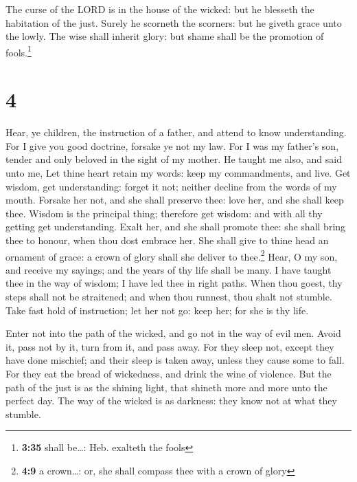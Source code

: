  The curse of the LORD is in the house of the wicked: but
he blesseth the habitation of the just.  Surely he
scorneth the scorners: but he giveth grace unto the lowly.
 The wise shall inherit glory: but shame shall be the
promotion of fools.\footnote{\textbf{3:35} shall be\ldots: Heb. exalteth
  the fools}

\hypertarget{section-3}{%
\section{4}\label{section-3}}

 Hear, ye children, the instruction of a father, and
attend to know understanding.  For I give you good
doctrine, forsake ye not my law.  For I was my father's
son, tender and only beloved in the sight of my mother. 
He taught me also, and said unto me, Let thine heart retain my words:
keep my commandments, and live.  Get wisdom, get
understanding: forget it not; neither decline from the words of my
mouth.  Forsake her not, and she shall preserve thee: love
her, and she shall keep thee.  Wisdom is the principal
thing; therefore get wisdom: and with all thy getting get understanding.
 Exalt her, and she shall promote thee: she shall bring
thee to honour, when thou dost embrace her.  She shall
give to thine head an ornament of grace: a crown of glory shall she
deliver to thee.\footnote{\textbf{4:9} a crown\ldots: or, she shall
  compass thee with a crown of glory}  Hear, O my son,
and receive my sayings; and the years of thy life shall be many.
 I have taught thee in the way of wisdom; I have led thee
in right paths.  When thou goest, thy steps shall not be
straitened; and when thou runnest, thou shalt not stumble.
 Take fast hold of instruction; let her not go: keep her;
for she is thy life.

 Enter not into the path of the wicked, and go not in the
way of evil men.  Avoid it, pass not by it, turn from it,
and pass away.  For they sleep not, except they have done
mischief; and their sleep is taken away, unless they cause some to fall.
 For they eat the bread of wickedness, and drink the wine
of violence.  But the path of the just is as the shining
light, that shineth more and more unto the perfect day. 
The way of the wicked is as darkness: they know not at what they
stumble.

